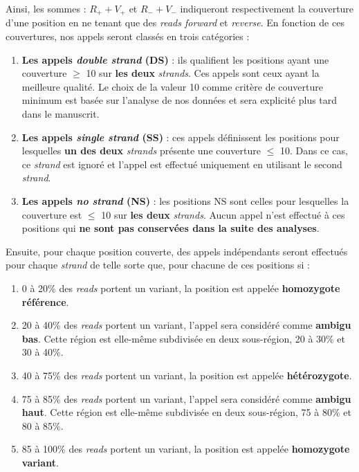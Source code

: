 \documentclass[12pt,a4paper,twoside]{ugathesis}
\theoremstyle{definition}
\theoremstyle{definition}
\theoremstyle{definition}
\theoremstyle{remark}
\begin{document}
Ainsi, les sommes : \(R_+ + V_+\) et \(R_- + V_-\) indiqueront
respectivement la couverture d'une position en ne tenant que des
\emph{reads forward} et \emph{reverse}. En fonction de ces couvertures,
nos appels seront classés en trois catégories :

\begin{enumerate}
\def\labelenumi{\arabic{enumi}.}
\item
  \textbf{Les appels \emph{double strand} (DS)} : ils qualifient les
  positions ayant une couverture \(\ge\) 10 sur \textbf{les deux}
  \emph{strands}. Ces appels sont ceux ayant la meilleure qualité. Le
  choix de la valeur 10 comme critère de couverture minimum est basée
  sur l'analyse de nos données et sera explicité plus tard dans le
  manuscrit.
\item
  \textbf{Les appels \emph{single strand} (SS)} : ces appels définissent
  les positions pour lesquelles \textbf{un des deux} \emph{strands}
  présente une couverture \(\le\) 10. Dans ce cas, ce \emph{strand} est
  ignoré et l'appel est effectué uniquement en utilisant le second
  \emph{strand}.
\item
  \textbf{Les appels \emph{no strand} (NS)} : les positions NS sont
  celles pour lesquelles la couverture est \(\le\) 10 sur \textbf{les
  deux} \emph{strands}. Aucun appel n'est effectué à ces positions qui
  \textbf{ne sont pas conservées dans la suite des analyses}.
\end{enumerate}

Ensuite, pour chaque position couverte, des appels indépendants seront
effectués pour chaque \emph{strand} de telle sorte que, pour chacune de
ces positions si :

\begin{enumerate}
\def\labelenumi{\arabic{enumi}.}
\item
  0 à 20\% des \emph{reads} portent un variant, la position est appelée
  \textbf{homozygote référence}.
\item
  20 à 40\% des \emph{reads} portent un variant, l'appel sera considéré
  comme \textbf{ambigu bas}. Cette région est elle-même subdivisée en
  deux sous-région, 20 à 30\% et 30 à 40\%.
\item
  40 à 75\% des \emph{reads} portent un variant, la position est appelée
  \textbf{hétérozygote}.
\item
  75 à 85\% des \emph{reads} portent un variant, l'appel sera considéré
  comme \textbf{ambigu haut}. Cette région est elle-même subdivisée en
  deux sous-région, 75 à 80\% et 80 à 85\%.
\item
  85 à 100\% des \emph{reads} portent un variant, la position est
  appelée \textbf{homozygote variant}.
\end{enumerate}
\end{document}
